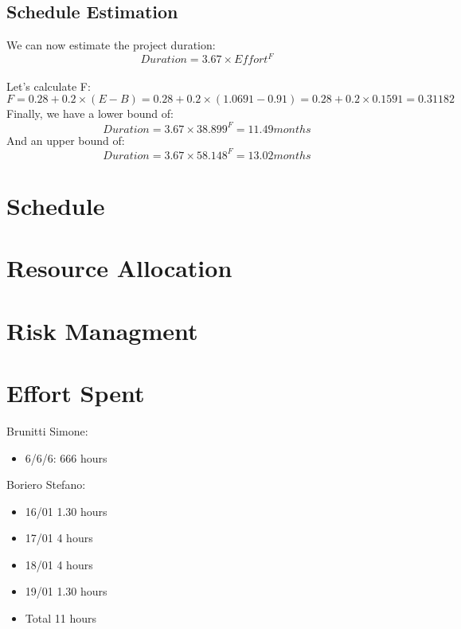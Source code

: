 \documentclass{article}
\begin{document}
\subsection{Schedule Estimation}
We can now estimate the project duration:\\
$$\displaystyle Duration = 3.67 \times Effort^F $$ \\
Let's calculate F:\\
$$\displaystyle F = 0.28 + 0.2 \times (E - B) = 0.28 + 0.2\times (1.0691 - 0.91) = 0.28 + 0.2\times 0.1591 = 0.31182 $$
Finally, we have a lower bound of:\\
$$\displaystyle Duration = 3.67 \times 38.899^F = 11.49 months $$ 
And an upper bound of:\\
$$\displaystyle Duration = 3.67 \times 58.148^F = 13.02 months $$ 
\newpage
\section{Schedule}

\newpage
\section{Resource Allocation}

\newpage
\section{Risk Managment}

\newpage
\section{Effort Spent}
Brunitti Simone:
\begin{itemize}
\item 6/6/6: 666 hours
\end{itemize}
Boriero Stefano:
\begin{itemize}
\item 16/01	1.30 hours
\item 17/01	4 hours
\item 18/01	4 hours
\item 19/01	1.30 hours
\item Total 11 hours
\end{itemize}
\end{document}
